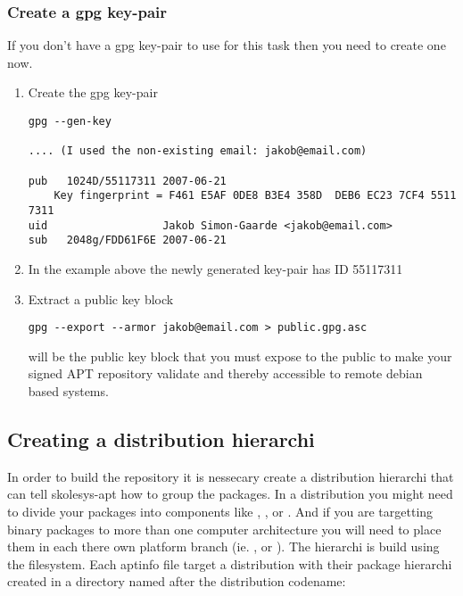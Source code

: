 \subsubsection{Create a gpg key-pair\label{skolesys-apt-creategpg}}
If you don't have a gpg key-pair to use for this task then you need to create one now.
\begin{enumerate}
 \item Create the gpg key-pair
 \begin{verbatim}
gpg --gen-key

.... (I used the non-existing email: jakob@email.com)

pub   1024D/55117311 2007-06-21
	Key fingerprint = F461 E5AF 0DE8 B3E4 358D  DEB6 EC23 7CF4 5511 7311
uid                  Jakob Simon-Gaarde <jakob@email.com>
sub   2048g/FDD61F6E 2007-06-21
 \end{verbatim}

 \item In the example above the newly generated key-pair has ID 55117311
 \item Extract a public key block	
 \begin{verbatim}
gpg --export --armor jakob@email.com > public.gpg.asc
 \end{verbatim}

  will be the public key block that you must expose to the public to make your signed APT repository validate and thereby accessible to remote debian based systems.

\end{enumerate}

\subsection{Creating a distribution hierarchi\label{skolesys-apt-pool}}
In order to build the repository it is nessecary create a distribution hierarchi that can tell skolesys-apt how to group the packages. In a distribution you might need to divide your packages into components like , ,  or . And if you are targetting binary packages to more than one computer architecture you will need to place them in each there own platform branch (ie. ,  or ). The hierarchi is build using the filesystem. Each aptinfo file target a distribution with their package hierarchi created in a directory named after the distribution codename:

